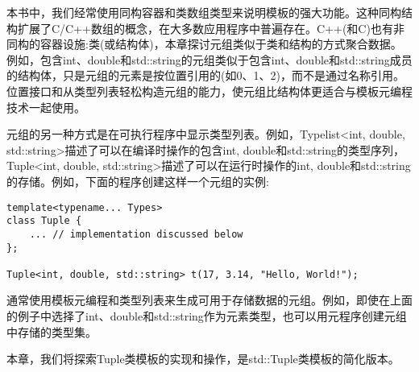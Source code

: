 本书中，我们经常使用同构容器和类数组类型来说明模板的强大功能。这种同构结构扩展了C/C++数组的概念，在大多数应用程序中普遍存在。C++(和C)也有非同构的容器设施:类(或结构体)，本章探讨元组类似于类和结构的方式聚合数据。例如，包含int、double和std::string的元组类似于包含int、double和std::string成员的结构体，只是元组的元素是按位置引用的(如0、1、2)，而不是通过名称引用。位置接口和从类型列表轻松构造元组的能力，使元组比结构体更适合与模板元编程技术一起使用。

元组的另一种方式是在可执行程序中显示类型列表。例如，Typelist<int, double, std::string>描述了可以在编译时操作的包含int, double和std::string的类型序列，Tuple<int, double, std::string>描述了可以在运行时操作的int, double和std::string的存储。例如，下面的程序创建这样一个元组的实例:

\begin{lstlisting}[style=styleCXX]
template<typename... Types>
class Tuple {
	... // implementation discussed below
};

Tuple<int, double, std::string> t(17, 3.14, "Hello, World!");
\end{lstlisting}

通常使用模板元编程和类型列表来生成可用于存储数据的元组。例如，即使在上面的例子中选择了int、double和std::string作为元素类型，也可以用元程序创建元组中存储的类型集。

本章，我们将探索Tuple类模板的实现和操作，是std::Tuple类模板的简化版本。






























